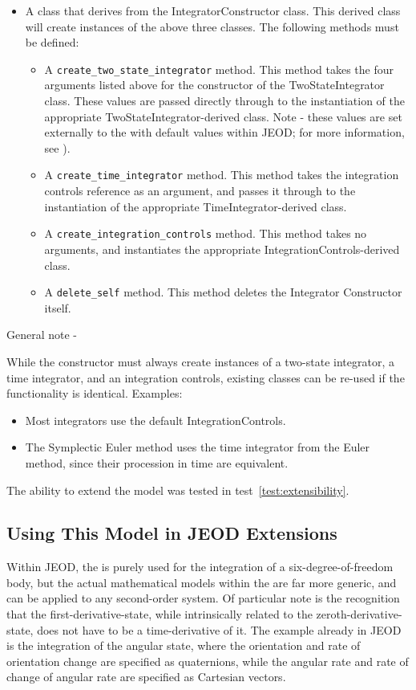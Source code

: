 \begin{itemize}
\item A class that derives from the IntegratorConstructor class. This derived 
class will create instances of the above three classes.  The following methods 
must be defined:
\begin{itemize}
 \item A \verb+create_two_state_integrator+ method.  This method takes the 
 four arguments listed above for the constructor of the TwoStateIntegrator 
 class.  These values are passed directly through to the instantiation of the 
 appropriate TwoStateIntegrator-derived class.  Note - these values are set 
 externally to the \ModelDesc with default values within JEOD; for more 
 information, see ).
 \item  A \verb+create_time_integrator+ method.  This method takes the 
 integration controls reference as an argument, and passes it through to the 
 instantiation of the appropriate TimeIntegrator-derived class.
 \item A \verb+create_integration_controls+ method.  This method takes no 
 arguments, and instantiates the appropriate IntegrationControls-derived class.
 \item A \verb+delete_self+ method.  This method deletes the Integrator 
 Constructor itself.
\end{itemize}

\end{itemize}

General note -
 
While the constructor must always create instances of a two-state integrator, 
a 
time integrator, and an integration controls, existing classes can be re-used 
if the functionality is identical.  Examples:
\begin{itemize}
 \item Most integrators use the default IntegrationControls.
 \item The Symplectic Euler method uses the time integrator from the Euler 
 method, since their procession in time are equivalent.
\end{itemize}




The ability to extend the model was tested in test~\ref{test:extensibility}.



\subsection{Using This Model in JEOD Extensions}\label{sec:user_modeldev_2}
Within JEOD, the \ModelDesc is purely used for the integration of a 
six-degree-of-freedom body, but the actual mathematical models within the 
\ModelDesc are far more generic, and can be applied to any second-order system.
Of particular note is the recognition that the first-derivative-state, while 
intrinsically related to the zeroth-derivative-state, does not have to be a 
time-derivative of it.  The example already in JEOD is the integration of the 
angular state, where the orientation and rate of orientation change are 
specified as quaternions, while the angular rate and rate of change of angular 
rate are specified as Cartesian vectors.

